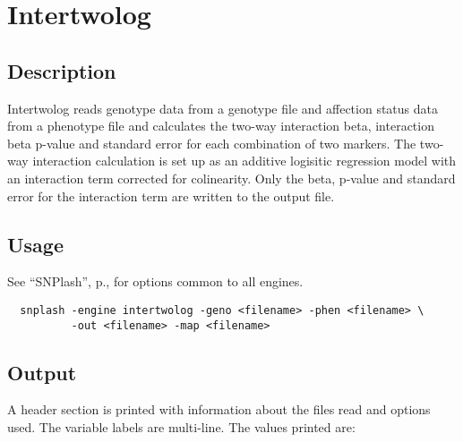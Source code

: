 
\section{Intertwolog}
\label{sec:i2l}
\subsection{Description}
Intertwolog reads genotype data from a genotype file and affection status data
from a phenotype file and calculates the two-way interaction beta, interaction
beta p-value and standard error for each combination of two markers.  The
two-way interaction calculation is set up as an additive logisitic regression
model with an interaction term corrected for colinearity.  Only the beta,
p-value and standard error for the interaction term are written to the output
file.

\subsection{Usage}
\label{sub:i2l_usage}
See ``SNPlash'', p.\pageref{sec:snplash}, for options common to all engines.

\begin{verbatim}
  snplash -engine intertwolog -geno <filename> -phen <filename> \
          -out <filename> -map <filename>
\end{verbatim}

\subsection{Output}
A header section is printed with information about the files read and options
used.  The variable labels are multi-line.  The values printed are:

